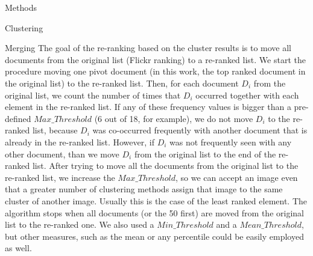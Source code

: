\documentclass{acm_proc_article-me}
\begin{document}
\begin{section}{Methods}
\begin{subsection}{Clustering}
\begin{subsubsection}{Merging}
The goal of the re-ranking based on the cluster results is to move all documents from the original list (Flickr ranking) to a re-ranked list.
We start the procedure moving one pivot document (in this work, the top ranked document in the original list) to the re-ranked list. Then, for each document $D_i$ from the original list, we count the number of times that $D_i$ occurred together with each element in the re-ranked list. 
If any of these frequency values is bigger than a pre-defined $Max\_Threshold$ (6 out of 18, for example), we do not move $D_i$ to the re-ranked list, because $D_i$ was co-occurred frequently with another document that is already in the re-ranked list. However, if $D_i$ was not frequently seen with any other document, than we move $D_i$ from the original list to the end of the re-ranked list.
After trying to move all the documents from the original list to the re-ranked list, we increase the $Max\_Threshold$, so we can accept an image even that a greater number of clustering methods assign that image to the same cluster of another image. Usually this is the case of the least ranked element.
The algorithm stops when all documents (or the 50 first) are moved from the original list to the re-ranked one.
We also used a $Min\_Threshold$ and a $Mean\_Threshold$, but other measures, such as the mean or any percentile could be easily employed as well.



\end{subsubsection}
\end{subsection}
\end{section}
\end{document}
